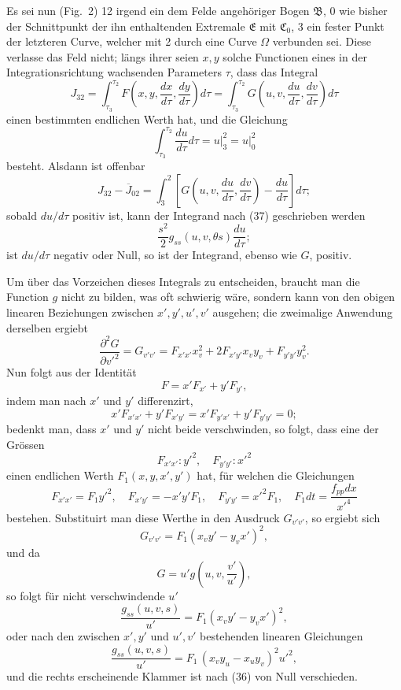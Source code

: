 \documentclass[11pt,a4paper,leqno]{article}
\begin{document}
Es sei nun (Fig.~2) 12 irgend ein dem Felde angehöriger Bogen $\mathfrak{B}$, 0 wie bisher der Schnittpunkt der ihn enthaltenden Extremale $\mathfrak{E}$ mit $\mathfrak{C}_0$, 3 ein fester Punkt der letzteren Curve, welcher mit 2 durch eine Curve $\Omega$ verbunden sei. Diese verlasse das Feld nicht; längs ihrer seien $x,y$ solche Functionen eines in der Integrationsrichtung wachsenden Parameters $\tau$, dass das Integral
\[
J_{32}=\int_{\tau_3}^{\tau_2}F\left(x,y,\frac{dx}{d\tau},\frac{dy}{d\tau}\right)d\tau
=\int_{\tau_3}^{\tau_2}G\left(u,v,\frac{du}{d\tau},\frac{dv}{d\tau}\right)d\tau
\]
einen bestimmten endlichen Werth hat, und die Gleichung
\begin{equation}\tag{38}
\int_{\tau_3}^{\tau_2}\frac{du}{d\tau}d\tau
=\left.u\right|_3^2
=\left.u\right|_0^2
\end{equation}
besteht. Alsdann ist offenbar
\begin{equation}\tag{39}
J_{32}-\overline{J}_{02}
=\int_3^2\left[G\left(u,v,\frac{du}{d\tau},\frac{dv}{d\tau}\right)-\frac{du}{d\tau}\right]d\tau;
\end{equation}
sobald $du/d\tau$ positiv ist, kann der Integrand nach (37) geschrieben werden
\begin{equation}\tag{40}
\frac{s^2}{2}g_{ss}(u,v,\theta s)\frac{du}{d\tau};
\end{equation}
ist $du/d\tau$ negativ oder Null, so ist der Integrand, ebenso wie $G$, positiv.

Um über das Vorzeichen dieses Integrals zu entscheiden, braucht man die Function $g$ nicht zu bilden, was oft schwierig wäre, sondern kann von den obigen linearen Beziehungen zwischen $x',y',u',v'$ ausgehen; die zweimalige Anwendung derselben ergiebt
\[
\frac{\partial^2G}{\partial v'^2}=G_{v'v'}=F_{x'x'}x_v^2+2F_{x'y'}x_vy_v+F_{y'y'}y_v^2.
\]
Nun folgt aus der Identität
\[
F=x'F_{x'}+y'F_{y'},
\]
indem man nach $x'$ und $y'$ differenzirt,
\[
x'F_{x'x'}+y'F_{x'y'}=x'F_{y'x'}+y'F_{y'y'}=0;
\]
bedenkt man, dass $x'$ und $y'$ nicht beide verschwinden, so folgt, dass eine der Grössen
\[
F_{x'x'}:y'^2,
\quad F_{y'y'}:x'^2
\]
einen endlichen Werth $F_1(x,y,x',y')$ hat, für welchen die Gleichungen
\[
F_{x'x'}=F_1y'^2,
\quad F_{x'y'}=-x'y'F_1,
\quad F_{y'y'}=x'^2F_1,
\quad F_1dt=\frac{f_{pp}dx}{x'^4}
\]
bestehen. Substituirt man diese Werthe in den Ausdruck $G_{v'v'}$, so ergiebt sich
\[
G_{v'v'}=F_1(x_vy'-y_vx')^2,
\]
und da
\[
G=u'g\left(u,v,\frac{v'}{u'}\right),
\]
so folgt für nicht verschwindende $u'$
\[
\frac{g_{ss}(u,v,s)}{u'}=F_1(x_vy'-y_vx')^2,
\]
oder nach den zwischen $x',y'$ und $u',v'$ bestehenden linearen Gleichungen
\[
\frac{g_{ss}(u,v,s)}{u'}=F_1\,(x_vy_u-x_uy_v)^2u'^2,
\]
und die rechts erscheinende Klammer ist nach (36) von Null verschieden.
\end{document}
